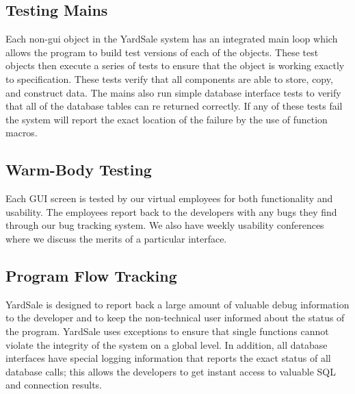 \documentclass{report}
\begin{document}
        \subsection{Testing Mains}
        Each non-gui object in the YardSale system has an integrated main loop which allows the program to build test versions of
        each of the objects.  These test objects then execute a series of tests to ensure that the object is working exactly to specification.  These tests verify that all components are able to store, copy, and construct data.  The mains also run simple database interface tests to verify that all of the database tables can re returned correctly.
        If any of these tests fail the system will report the exact location of the failure by the use of function macros.

        \subsection{Warm-Body Testing}
        Each GUI screen is tested by our virtual employees for both functionality and usability.  The employees report back to the developers with any
        bugs they find through our bug tracking system.  We also have weekly usability conferences where we discuss the merits of a particular interface.

        \subsection{Program Flow Tracking}
        YardSale is designed to report back a large amount of valuable debug information to the developer and to keep the non-technical user
        informed about the status of the program.  YardSale uses exceptions to ensure that single functions cannot violate the integrity of the system
        on a global level.  In addition, all database interfaces have special logging information that reports the exact status of all database calls; this
        allows the developers to get instant access to valuable SQL and connection results.
\end{document}
